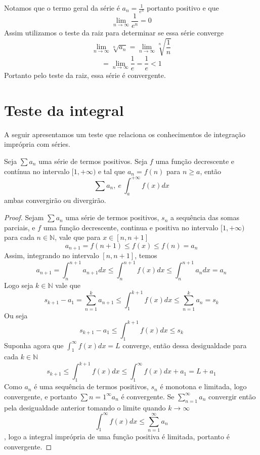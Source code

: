 \begin{exer}
    Notamos que o termo geral da série é $a_n = \frac{1}{e^n}$ portanto positivo
    e que
    $$\lim_{n \to \infty} \frac{1}{e^n} = 0$$
    Assim utilizamos o teste da raiz para determinar se essa série converge
    $$\lim_{n \to \infty} \sqrt[n]{a_n} = \lim_{n \to \infty} \sqrt[n]{\frac{1}{n}} $$
    $$ = \lim_{n \to \infty} \frac{1}{e} = \frac{1}{e} < 1 $$
    Portanto pelo teste da raiz, essa série é convergente.
\end{exer}


\section{Teste da integral}
\construirSec

A seguir apresentamos um teste que relaciona os conhecimentos de integração
imprópria com séries.

\begin{teo}
    Seja $\sum a_n$ uma série de termos positivos. Seja $f$ uma função
    decrescente e contínua no intervalo $[1, +\infty)$ e tal que 
    $a_n = f(n)$ para $n \geq a$, então
    $$\sum a_n, \: e \: \int_a^{+\infty} f(x) dx $$
    ambas convergirão ou divergirão. 
\end{teo}

\begin{proof}
    Sejam $\sum a_n$ uma série de termos positivos, $s_n$ a sequência das somas
    parciais, e $f$ uma função decrescente, continua e positiva no intervalo
    $[1, +\infty)$ para cada $n \in \mathbb{N}$, vale que para $x \in [n, n+1]$
    $$a_{n+1} = f(n+1) \leq f(x) \leq f(n) = a_{n} $$
    Assim, integrando no intervalo $[n,n+1]$, temos
    $$a_{n+1} = \int_n^{n+1} a_{n+1} dx \leq \int_n^{n+1} f(x) dx \leq 
    \int_n^{n+1} a_{n} dx = a_{n} $$
    Logo seja $k \in \mathbb{N}$ vale que
    $$s_{k+1} - a_1 = \sum_{n = 1}^k a_{n+1} \leq \int_1^{k+1} f(x) dx\leq 
    \sum_{n = 1}^k a_{n} = s_k$$
    Ou seja
    $$s_{k+1} - a_1 \leq \int_{1}^{k+1}f(x) dx \leq s_{k}$$
    Suponha agora que $\int_{1}^{\infty} f(x) dx = L$ converge, então dessa 
    desigualdade para cada $k \in \mathbb{N}$
    $$s_{k+1} \leq \int_{1}^{k+1}f(x) dx \leq \int_{1}^{\infty} f(x) dx + a_1 =L + a_1$$
    Como $a_n$ é uma sequência de termos positivos, $s_n$ é monotona e limitada,
    logo convergente, e portanto $\sum{n=1}^{\infty} a_n$ é convergente.
    Se $\sum_{n=1}^{\infty} a_n$ convergir então pela desigualdade anterior
    tomando o limite quando $k \to \infty$
    $$\int_{1}^{\infty} f(x) dx \leq \sum_{n=1}^{\infty} a_n$$,
    logo a integral imprópria de uma função positiva é limitada, portanto é
    convergente.
\end{proof}
